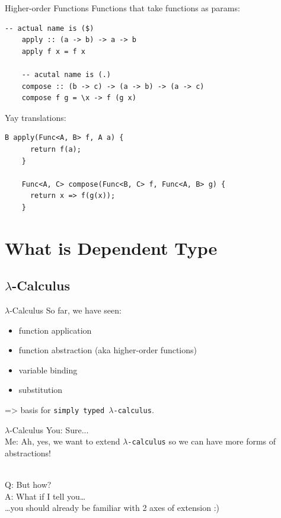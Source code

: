 \documentclass[xcolor={usenames,dvipsnames}]{beamer}
\begin{document}
\begin{frame}[fragile]{Higher-order Functions}
  Functions that take functions as params:
  \begin{lstlisting}[style=hask]
    -- actual name is ($)
    apply :: (a -> b) -> a -> b
    apply f x = f x

    -- acutal name is (.)
    compose :: (b -> c) -> (a -> b) -> (a -> c)
    compose f g = \x -> f (g x)
  \end{lstlisting}

  Yay translations:
  \begin{lstlisting}[style=hask]
    B apply(Func<A, B> f, A a) {
      return f(a);
    }

    Func<A, C> compose(Func<B, C> f, Func<A, B> g) {
      return x => f(g(x));
    }
  \end{lstlisting}
\end{frame}


\section{What is Dependent Type}

\subsection{$\lambda$-Calculus}

\begin{frame}[fragile]{$\lambda$-Calculus}
  So far, we have seen:
  \begin{itemize}
    \item function application
    \item function abstraction {\tiny(aka higher-order functions)}
    \item variable binding
    \item substitution
  \end{itemize}
  => basis for \texttt{simply typed $\lambda$-calculus}.
\end{frame}

\begin{frame}[fragile]{$\lambda$-Calculus}
  You: Sure...\\
  Me: Ah, yes, we want to extend \texttt{$\lambda$-calculus} so we can have more forms of abstractions!

  \ \\
  \pause
  Q: But how?\\
  A: What if I tell you\ldots\\
  \qquad \ldots you should already be familiar with 2 axes of extension :)
\end{frame}
\end{document}
